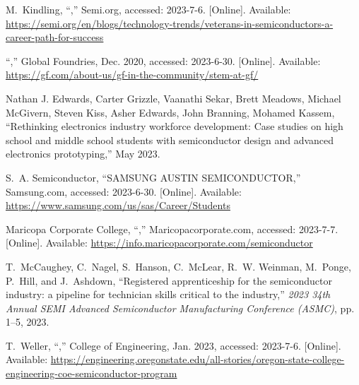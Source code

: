 \documentclass[conference]{IEEEtran}
\begin{document}
\begin{thebibliography}{10}
\BIBentryALTinterwordspacing
M.~Kindling, ``,'' Semi.org, accessed: 2023-7-6. [Online].
  Available:
  \url{https://semi.org/en/blogs/technology-trends/veterans-in-semiconductors-a-career-path-for-success}
\BIBentrySTDinterwordspacing

\BIBentryALTinterwordspacing
``,'' {Global Foundries}, Dec. 2020, accessed: 2023-6-30. [Online].
  Available: \url{https://gf.com/about-us/gf-in-the-community/stem-at-gf/}
\BIBentrySTDinterwordspacing

{Nathan J. Edwards, Carter Grizzle, Vaanathi Sekar, Brett Meadows, Michael
  McGivern, Steven Kiss, Asher Edwards, John Branning, Mohamed Kassem},
  ``Rethinking electronics industry workforce development: Case studies on high
  school and middle school students with semiconductor design and advanced
  electronics prototyping,'' May 2023.

\BIBentryALTinterwordspacing
S.~A. Semiconductor, ``{SAMSUNG} {AUSTIN} {SEMICONDUCTOR},'' Samsung.com,
  accessed: 2023-6-30. [Online]. Available:
  \url{https://www.samsung.com/us/sas/Career/Students}
\BIBentrySTDinterwordspacing

\BIBentryALTinterwordspacing
{Maricopa Corporate College}, ``,'' Maricopacorporate.com, accessed: 2023-7-7.
  [Online]. Available: \url{https://info.maricopacorporate.com/semiconductor}
\BIBentrySTDinterwordspacing

T.~McCaughey, C.~Nagel, S.~Hanson, C.~McLear, R.~W. Weinman, M.~Ponge, P.~Hill,
  and J.~Ashdown, ``Registered apprenticeship for the semiconductor industry: a
  pipeline for technician skills critical to the industry,'' \emph{2023 34th
  Annual SEMI Advanced Semiconductor Manufacturing Conference (ASMC)}, pp.
  1--5, 2023.

\BIBentryALTinterwordspacing
T.~Weller, ``,''
  College of Engineering, Jan. 2023, accessed: 2023-7-6. [Online]. Available:
  \url{https://engineering.oregonstate.edu/all-stories/oregon-state-college-engineering-coe-semiconductor-program}
\BIBentrySTDinterwordspacing


\end{thebibliography}
\end{document}
